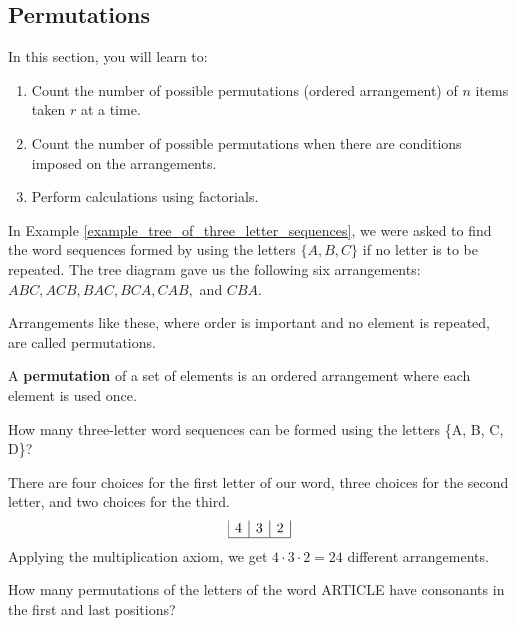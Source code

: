 \subsection{Permutations}
In this section, you will learn to:
\begin{enumerate}
    \item Count the number of possible permutations (ordered arrangement) of \( n \) items taken \( r \) at a time.
    \item Count the number of possible permutations when there are conditions imposed on the arrangements.
    \item Perform calculations using factorials.
\end{enumerate}

In Example \ref{example_tree_of_three_letter_sequences}, we were asked to find the word sequences formed by using the letters \( \{A, B, C\} \) if no letter is to be repeated. The tree diagram gave us the following six arrangements: \( ABC, ACB, BAC, BCA, CAB, \) and \( CBA \).

Arrangements like these, where order is important and no element is repeated, are called permutations.

\begin{definition}
    A \textbf{permutation} of a set of elements is an ordered arrangement where each element is used once.
\end{definition}

\begin{example}
    How many three-letter word sequences can be formed using the letters \{A, B, C, D\}?
\end{example}

\begin{solution}
    There are four choices for the first letter of our word, three choices for the second letter, and two choices for the third.
    \[
        \begin{array}{|c|c|c|}
            4 & 3 & 2 \\
            \hline
        \end{array}
    \]
    Applying the multiplication axiom, we get \( 4 \cdot 3 \cdot 2 = 24 \) different arrangements.
\end{solution}

\begin{example}
    How many permutations of the letters of the word ARTICLE have consonants in the first and last positions?
\end{example}

